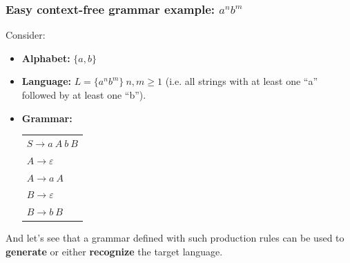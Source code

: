 \documentclass[11pt]{beamer}
\begin{document}
\begin{frame}
\frametitle{Easy context-free grammar example: $a^nb^m$}
	Consider:
	\begin{itemize}
		\item \textbf{Alphabet:} $\{a,b\}$ 
		\item \textbf{Language:} $L = \{a^nb^m\}\ n, m\geq 1$ (i.e. all strings with at least one ``a'' followed by at least one ``b'').
		\item \textbf{Grammar:} \begin{tabular}{l} $S \rightarrow a\ A\ b\ B$ \\ 
																							 $A \rightarrow \varepsilon$ \\
																							 $A \rightarrow a\ A$ \\
																							 $B \rightarrow \varepsilon$ \\
																							 $B \rightarrow b\ B$ \\
																						\end{tabular}
	\end{itemize}
	And let's see that a grammar defined with such production rules can be used to \textbf{generate} or either \textbf{recognize} the target language.
\end{frame}
\end{document}
